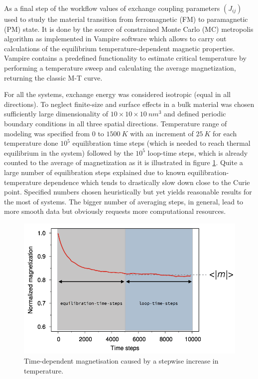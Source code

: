 As a final step of the workflow values of exchange coupling parameters $(J_{ij})$ used to study the material transition from ferromagnetic (FM) to paramagnetic (PM) state. It is done by the source of constrained Monte Carlo (MC) metropolis algorithm as implemented in Vampire software which allows to carry out calculations of the equilibrium temperature-dependent magnetic properties. Vampire contains a predefined functionality to estimate critical temperature by performing a temperature sweep and calculating the average magnetization, returning the classic M-T curve.

For all the systems, exchange energy was considered isotropic (equal in all directions). To neglect finite-size and surface effects in a bulk material was chosen sufficiently large dimensionality of $10 \times 10 \times 10\ nm^3$ and defined periodic boundary conditions in all three spatial directions.  Temperature range of modeling was specified from $0$ to $1500\ K$ with an increment of $25\ K$ for each temperature done $10^5$ equilibration time steps (which is needed to reach thermal equilibrium in the system) followed by the $10^5$ loop-time steps, which is already counted to the average of magnetization as it is illustrated in figure \ref{fig:time_magnetization}.  Quite a large number of equilibration steps explained due to known equilibration-temperature dependence which tends to drastically slow down close to the Curie point. Specified numbers chosen heuristically but yet yields reasonable results for the most of systems.
The bigger number of averaging steps, in general, lead to more smooth data but obviously requests more computational resources.

\begin{figure}[H]
\centering
\captionsetup{justification=centering,margin=2cm}
\includegraphics[width=120mm]{fig/dft_fig/time_magnetization.png}
\caption[Time-dependent magnetisation caused by a stepwise increase in temperature.]{Time-dependent magnetisation caused by a stepwise increase in temperature.}
\label{fig:time_magnetization}
\end{figure}

